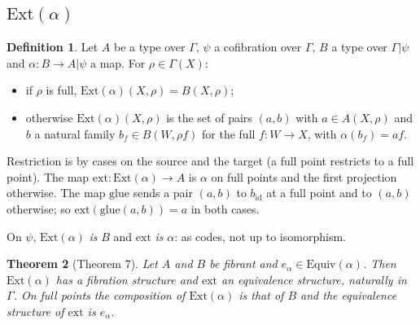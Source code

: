 \documentclass[11pt]{article}
\newcommand{\Ext}{\mathrm{Ext}}
\newcommand{\ext}{\mathrm{ext}}
\newcommand{\glue}{\mathrm{glue}}
\newcommand{\Equiv}{\mathrm{Equiv}}
\newcommand{\id}{\mathrm{id}}
\theoremstyle{plain}
\newtheorem{theorem}{Theorem}[section]
\theoremstyle{definition}
\newtheorem{definition}[theorem]{Definition}
\theoremstyle{remark}
\begin{document}
\subsection{$\Ext(\alpha)$}

\begin{definition}
Let $A$ be a type over $\Gamma$, $\psi$ a cofibration over $\Gamma$, $B$ a
type over $\Gamma|\psi$ and $\alpha:B\to A|\psi$ a map. For
$\rho\in\Gamma(X)$:
\begin{itemize}
\item if $\rho$ is full, $\Ext(\alpha)(X,\rho)=B(X,\rho)$;
\item otherwise $\Ext(\alpha)(X,\rho)$ is the set of pairs $(a,b)$ with
  $a\in A(X,\rho)$ and $b$ a natural family $b_f\in B(W,\rho f)$ for the
  full $f:W\to X$, with $\alpha(b_f)=af$.
\end{itemize}
Restriction is by cases on the source and the target (a full point
restricts to a full point). The map $\ext:\Ext(\alpha)\to A$ is $\alpha$
on full points and the first projection otherwise. The map $\glue$ sends
a pair $(a,b)$ to $b_\id$ at a full point and to $(a,b)$ otherwise; so
$\ext(\glue(a,b))=a$ in both cases.
\end{definition}

On $\psi$, $\Ext(\alpha)$ \emph{is} $B$ and $\ext$ \emph{is} $\alpha$: as
codes, not up to isomorphism.

\begin{theorem}[Theorem 7]\label{thm:7}
Let $A$ and $B$ be fibrant and $e_\alpha\in\Equiv(\alpha)$. Then
$\Ext(\alpha)$ has a fibration structure and $\ext$ an equivalence
structure, naturally in $\Gamma$. On full points the composition of
$\Ext(\alpha)$ is that of $B$ and the equivalence structure of $\ext$ is
$e_\alpha$.
\end{theorem}
\end{document}
